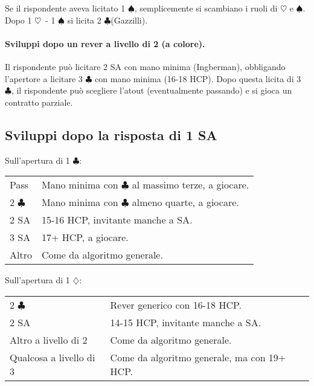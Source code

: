 \documentclass[a4paper,10pt]{article}
\renewcommand{\c}{$\clubsuit$\xspace}
\renewcommand{\d}{$\diamondsuit$\xspace}
\newcommand{\h}{$\heartsuit$\xspace}
\newcommand{\s}{$\spadesuit$\xspace}
\newcommand{\sa}{SA\xspace}
\newcommand{\smallspace}{\vskip0.3cm}
\newenvironment{twocol}
  {\smallspace\noindent\begin{tabular}{l p{0.78\textwidth}}}
  {\end{tabular}\smallspace}
\begin{document}
\noindent Se il rispondente aveva licitato 1 \s, semplicemente si scambiano i ruoli di \h e \s.
\smallspace
\noindent Dopo 1 \h\ - 1 \s si licita 2 \c (Gazzilli).

\paragraph{Sviluppi dopo un rever a livello di 2 (a colore).} Il rispondente può licitare 2 \sa con mano minima (Ingberman), obbligando l'apertore a licitare 3 \c con mano minima (16-18 HCP). Dopo questa licita di 3 \c, il rispondente può scegliere l'atout (eventualmente passando) e si gioca un contratto parziale.



\subsection{Sviluppi dopo la risposta di 1 \sa}

\noindent Sull'apertura di 1 \c:
\begin{twocol}
	Pass & Mano minima con \c al massimo terze, a giocare. \\
	2 \c & Mano minima con \c almeno quarte, a giocare. \\
	2 \sa & 15-16 HCP, invitante manche a \sa.\\
	3 \sa & 17+ HCP, a giocare.\\
	Altro & Come da algoritmo generale.
\end{twocol}

\noindent Sull'apertura di 1 \d:
\begin{twocol}
	2 \c & Rever generico con 16-18 HCP.\\
	2 \sa & 14-15 HCP, invitante manche a \sa.\\
	Altro a livello di 2 & Come da algoritmo generale.\\
	Qualcosa a livello di 3 & Come da algoritmo generale, ma con 19+ HCP.
\end{twocol}
\end{document}
